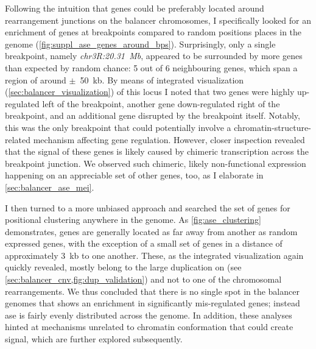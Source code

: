Following the intuition that \ase genes could be preferably located around
rearrangement junctions on the balancer chromosomes, I specifically
looked for an enrichment of \ase genes at breakpoints compared to random
positions places in the genome (\cref{fig:suppl_ase_genes_around_bps}).
Surprisingly, only a single breakpoint, namely \textit{chr3R:20.31~Mb},
appeared to be surrounded by more \ase genes than expected by random chance: 5
out of 6 neighbouring genes, which span a region of around $\pm$~50~kb.
By means of integrated visualization (\cref{sec:balancer_visualization}) of this
locus I noted that two genes were highly up-regulated left of the breakpoint,
another gene down-regulated right of the breakpoint, and an additional gene
disrupted by the breakpoint itself. Notably, this was the only breakpoint
that could potentially involve a chromatin-structure-related mechanism affecting
gene regulation. However, closer inspection revealed that the \ase signal of
these genes is likely caused by chimeric transcription across the breakpoint
junction. We observed such chimeric, likely non-functional expression happening
on an appreciable set of other genes, too, as I elaborate in
\cref{sec:balancer_ase_mei}.


I then turned to a more unbiased approach and searched the set of \ase
genes for positional clustering anywhere in the genome.
As \cref{fig:ase_clustering} demonstrates, \ase genes are generally located as
far away from another as random expressed genes, with the exception of
a small set of genes in a distance of approximately 3~kb to one another.
These, as the integrated visualization again quickly revealed, mostly belong to
the large duplication on \cyo (see \cref{sec:balancer_cnv,fig:dup_validation})
and not to one of the chromosomal rearrangements. We thus concluded that there
is no single spot in the balancer genomes that shows an enrichment in
significantly mis-regulated genes; instead \acl{ase} is fairly
evenly distributed across the genome. In addition, these analyses hinted at
mechanisms unrelated to chromatin conformation that could create \ase signal,
which are further explored subsequently.





